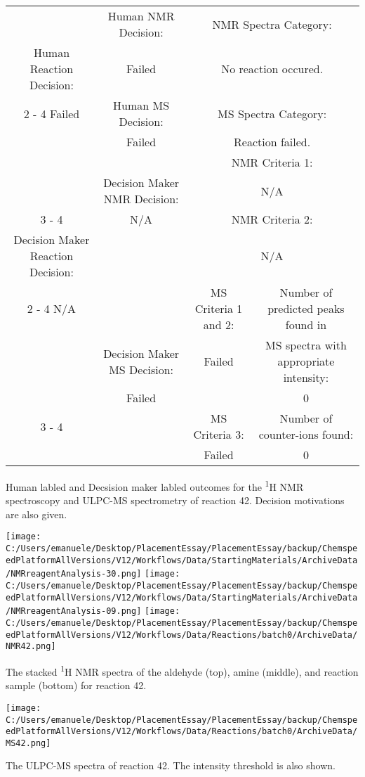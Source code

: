 \documentclass{article}%
\begin{document}
\begin{Decision Table}[H]%
\begin{tabular}{|c|c|c|c|}%
\hline%
&Human NMR Decision:&\multicolumn{2}{|c|}{NMR Spectra Category:}\\%
Human Reaction Decision:&Failed&\multicolumn{2}{|c|}{No reaction occured.}\\%
\cline{2%
-%
4}%
Failed&Human MS Decision:&\multicolumn{2}{|c|}{MS Spectra Category:}\\%
&Failed&\multicolumn{2}{|c|}{Reaction failed.}\\%
\hline%
&&\multicolumn{2}{|c|}{NMR Criteria 1:}\\%
&Decision Maker NMR Decision:&\multicolumn{2}{|c|}{N/A}\\%
\cline{3%
-%
4}%
&N/A&\multicolumn{2}{|c|}{NMR Criteria 2:}\\%
Decision Maker Reaction Decision:&&\multicolumn{2}{|c|}{N/A}\\%
\cline{2%
-%
4}%
N/A&&MS Criteria 1 and 2:&Number of predicted peaks found in\\%
&Decision Maker MS Decision:&Failed&MS spectra with appropriate intensity:\\%
&Failed&&0\\%
\cline{3%
-%
4}%
&&MS Criteria 3:&Number of counter{-}ions found:\\%
&&Failed&0\\%
\hline%
\end{tabular}%
\caption{Human labled and Decsision maker labled outcomes for the \textsuperscript{1}H NMR spectroscopy and ULPC-MS spectrometry of reaction 42. Decision motivations are also given.}%
\end{Decision Table}%
\begin{NMR Spectra}[H]%
\begin{center}%
\texttt{[image: C:/Users/emanuele/Desktop/PlacementEssay/PlacementEssay/backup/ChemspeedPlatformAllVersions/V12/Workflows/Data/StartingMaterials/ArchiveData/NMRreagentAnalysis-30.png]}\hfill%
\texttt{[image: C:/Users/emanuele/Desktop/PlacementEssay/PlacementEssay/backup/ChemspeedPlatformAllVersions/V12/Workflows/Data/StartingMaterials/ArchiveData/NMRreagentAnalysis-09.png]}\hfill%
\texttt{[image: C:/Users/emanuele/Desktop/PlacementEssay/PlacementEssay/backup/ChemspeedPlatformAllVersions/V12/Workflows/Data/Reactions/batch0/ArchiveData/NMR42.png]}\hfill%
\end{center}%
\caption{The stacked \textsuperscript{1}H NMR spectra of the aldehyde (top), amine (middle), and reaction sample (bottom) for reaction 42.}%
\end{NMR Spectra}%
\begin{MS Spectra}[H]%
\begin{center}%
\texttt{[image: C:/Users/emanuele/Desktop/PlacementEssay/PlacementEssay/backup/ChemspeedPlatformAllVersions/V12/Workflows/Data/Reactions/batch0/ArchiveData/MS42.png]}\hfill%
\end{center}%
\caption{The ULPC-MS spectra of reaction 42. The intensity threshold is also shown.}%
\end{MS Spectra}%
\end{document}
